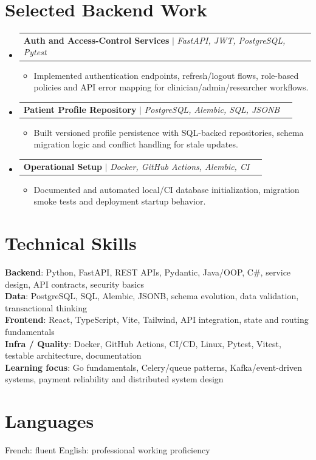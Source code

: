 \documentclass[letterpaper,11pt]{article}
\makeatletter
\newcommand{\resumeItem}[1]{\item\small{#1 \vspace{-2pt}}}
\newcommand{\resumeProjectHeading}[2]{
    \item
    \begin{tabular*}{0.97\textwidth}{l@{\extracolsep{\fill}}r}
      \small#1 & #2 \\
    \end{tabular*}\vspace{-7pt}
}
\newcommand{\resumeSubHeadingListStart}{\begin{itemize}[leftmargin=0.15in, label={}]}
\newcommand{\resumeSubHeadingListEnd}{\end{itemize}}
\newcommand{\resumeItemListStart}{\begin{itemize}[leftmargin=0.18in]}
\newcommand{\resumeItemListEnd}{\end{itemize}\vspace{-5pt}}
\makeatother
\begin{document}
\section{Selected Backend Work}
\resumeSubHeadingListStart
  \resumeProjectHeading
    {\textbf{Auth and Access-Control Services} $|$ \emph{FastAPI, JWT, PostgreSQL, Pytest}}{}
    \resumeItemListStart
      \resumeItem{Implemented authentication endpoints, refresh/logout flows, role-based policies and API error mapping for clinician/admin/researcher workflows.}
    \resumeItemListEnd
  \resumeProjectHeading
    {\textbf{Patient Profile Repository} $|$ \emph{PostgreSQL, Alembic, SQL, JSONB}}{}
    \resumeItemListStart
      \resumeItem{Built versioned profile persistence with SQL-backed repositories, schema migration logic and conflict handling for stale updates.}
    \resumeItemListEnd
  \resumeProjectHeading
    {\textbf{Operational Setup} $|$ \emph{Docker, GitHub Actions, Alembic, CI}}{}
    \resumeItemListStart
      \resumeItem{Documented and automated local/CI database initialization, migration smoke tests and deployment startup behavior.}
    \resumeItemListEnd
\resumeSubHeadingListEnd

\section{Technical Skills}
\begin{itemize}[leftmargin=0.15in, label={}]
  \small{\item{
    \textbf{Backend}{: Python, FastAPI, REST APIs, Pydantic, Java/OOP, C\#, service design, API contracts, security basics} \\
    \textbf{Data}{: PostgreSQL, SQL, Alembic, JSONB, schema evolution, data validation, transactional thinking} \\
    \textbf{Frontend}{: React, TypeScript, Vite, Tailwind, API integration, state and routing fundamentals} \\
    \textbf{Infra / Quality}{: Docker, GitHub Actions, CI/CD, Linux, Pytest, Vitest, testable architecture, documentation} \\
    \textbf{Learning focus}{: Go fundamentals, Celery/queue patterns, Kafka/event-driven systems, payment reliability and distributed system design}
  }}
\end{itemize}

\section{Languages}
\small{French: fluent \quad English: professional working proficiency}
\end{document}

